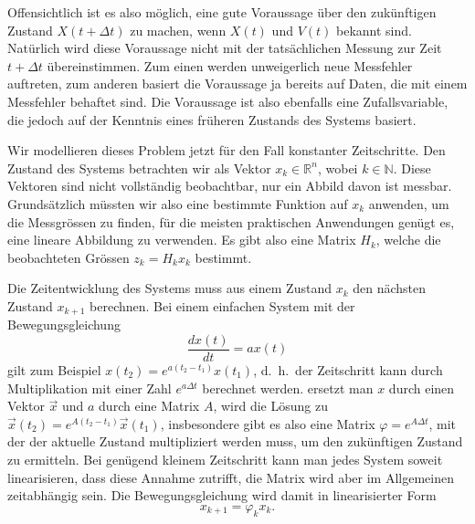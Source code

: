 Offensichtlich ist es also möglich, eine gute Voraussage über den
zukünftigen Zustand $X(t+\Delta t)$ zu machen, wenn $X(t)$ und $V(t)$
bekannt sind.
Natürlich wird diese Voraussage nicht mit der tatsächlichen
Messung zur Zeit $t+\Delta t$ übereinstimmen.
Zum einen werden unweigerlich
neue Messfehler auftreten, zum anderen basiert die Voraussage ja bereits
auf Daten, die mit einem Messfehler behaftet sind.
Die Voraussage ist also
ebenfalls eine Zufallsvariable, die jedoch auf der Kenntnis eines früheren
Zustands des Systems basiert.

Wir modellieren dieses Problem jetzt für den Fall konstanter Zeitschritte.
Den Zustand des Systems betrachten wir als Vektor $x_k\in\mathbb{R}^n$,
wobei $k\in\mathbb{N}$.
Diese Vektoren sind nicht vollständig beobachtbar,
nur ein Abbild davon ist messbar.
Grundsätzlich müssten wir also eine
bestimmte Funktion auf $x_k$ anwenden, um die Messgrössen zu finden,
für die meisten praktischen Anwendungen genügt es, eine lineare Abbildung
zu verwenden.
Es gibt also eine Matrix $H_k$, welche die beobachteten
Grössen $z_k=H_kx_k$ bestimmt.

Die Zeitentwicklung des Systems muss aus einem Zustand $x_k$ den nächsten
Zustand $x_{k+1}$ berechnen.
Bei einem
einfachen System mit der Bewegungsgleichung
\[
\frac{dx(t)}{dt}=ax(t)
\]
gilt zum Beispiel $x(t_2)=e^{a(t_2-t_1)}x(t_1)$, d.~h.~der Zeitschritt
kann durch Multiplikation mit einer Zahl $e^{a\Delta t}$ berechnet werden.
ersetzt man $x$ durch einen Vektor $\vec x$ und $a$ durch eine Matrix
$A$, wird die Lösung zu $\vec x(t_2)=e^{A(t_2-t_1)}\vec x(t_1)$,
insbesondere gibt es also eine Matrix $\varphi=e^{A\Delta t}$, mit
der der aktuelle Zustand multipliziert werden muss, um den zukünftigen
Zustand zu ermitteln.
Bei genügend kleinem Zeitschritt kann man jedes
System soweit linearisieren, dass diese Annahme zutrifft, die Matrix
wird aber im Allgemeinen zeitabhängig sein.
Die Bewegungsgleichung
wird damit in linearisierter Form
\[
x_{k+1}=\varphi_kx_k.
\]

